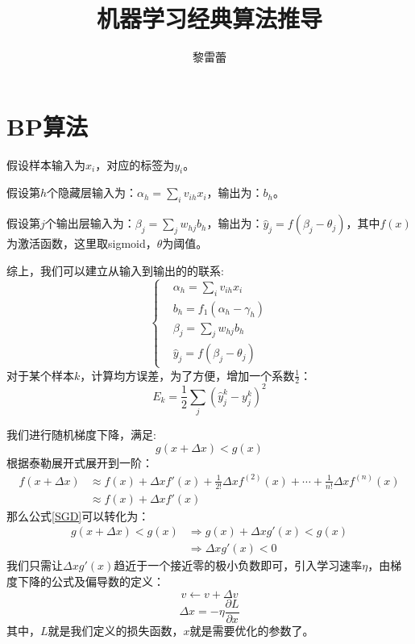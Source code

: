 \documentclass[11pt]{report}
\title{机器学习经典算法推导}
\author{黎雷蕾}
\begin{document}
\maketitle
\tableofcontents
\chapter{BP算法}
假设样本输入为$x_i$，对应的标签为$y_i$。
\par
假设第$h$个隐藏层输入为：$\alpha_h=\sum_i v_{ih}x_i$，输出为：$b_h$。
\par
假设第$j$个输出层输入为：$\beta_j=\sum_j w_{hj}b_h$，输出为：$\hat{y}_j=f(\beta_j-\theta_j)$，其中$f(x)$为激活函数，这里取sigmoid，$\theta$为阈值。
\par
综上，我们可以建立从输入到输出的的联系:
\begin{equation}
\label{NN_process}
	\begin{cases}
		& \alpha_h=\sum_i v_{ih}x_i\\
		& b_h=f_1(\alpha_h-\gamma_h)\\
		& \beta_j=\sum_j w_{hj}b_h\\
		& \hat{y}_j=f(\beta_j-\theta_j)
	\end{cases}
\end{equation}
对于某个样本$k$，计算均方误差，为了方便，增加一个系数$\frac{1}{2}$：
\begin{equation}
	E_k=\frac{1}{2}\sum_j(\hat{y}_j^k-y_j^k)^2
\end{equation}
\par
我们进行随机梯度下降，满足:
\begin{equation}
\label{SGD}
	g(x+\Delta x)<g(x)
\end{equation}
根据泰勒展开式展开到一阶：
\begin{equation}
\begin{split}
	f(x+\Delta x)&\approx f(x)+\Delta xf'(x)+\frac{1}{2!}\Delta xf^{(2)}(x)+\cdots+\frac{1}{n!}\Delta xf^{(n)}(x)\\
	&\approx f(x)+\Delta xf'(x)
\end{split}
\end{equation}
那么公式\ref{SGD}可以转化为：
\begin{equation}
\begin{split}
	g(x+\Delta x)<g(x)&\Rightarrow g(x)+\Delta xg'(x)<g(x)\\
	&\Rightarrow \Delta xg'(x)<0
\end{split}
\end{equation}
我们只需让$\Delta xg'(x)$趋近于一个接近零的极小负数即可，引入学习速率$\eta$，由梯度下降的公式及偏导数的定义：
\begin{equation}
	v\leftarrow v+\Delta v
\end{equation}
\begin{equation}
\label{optimal_target}
	\Delta x =-\eta\frac{\partial L}{\partial x}
\end{equation}
其中，$L$就是我们定义的损失函数，$x$就是需要优化的参数了。
\end{document}
